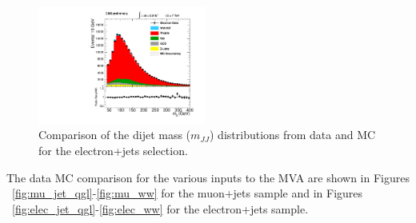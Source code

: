 \begin{figure}[h!t]
  {\centering
    \includegraphics[width=0.49\textwidth]{plots/2012_DataMC/el_mjj.pdf}
    \caption{Comparison of the dijet mass ($m_{JJ}$) distributions from data and MC for 
      the electron+jets selection. }
    \label{fig:elec_mjj}}
\end{figure}
\clearpage
The data MC comparison for the various inputs to the MVA are shown in  
Figures ~\ref{fig:mu_jet_qgl}-\ref{fig:mu_ww}
for the muon+jets sample and in 
Figures ~\ref{fig:elec_jet_qgl}-\ref{fig:elec_ww} for
the electron+jets sample. 

